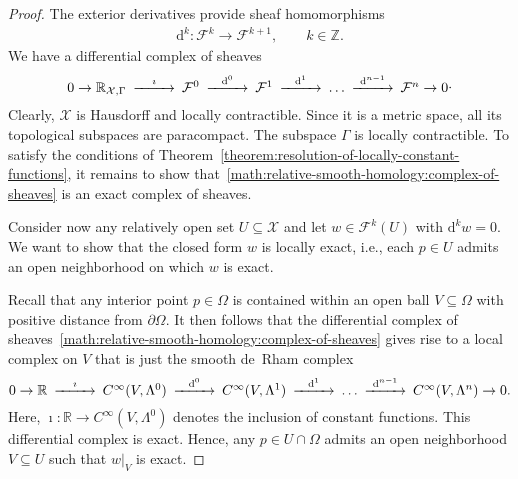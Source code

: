\documentclass[10pt,a4paper]{amsart}
\theoremstyle{definition}
\theoremstyle{remark}
\numberwithin{equation}{section}
\newcommand{\bbR}{{\mathbb R}}
\newcommand{\bbZ}{{\mathbb Z}}
\newcommand{\calF}{{\mathcal F}}
\newcommand{\calX}{{\mathcal X}}
\renewcommand{\restriction}{|}
\newcommand{\cartan}{{\mathrm d}}
\newcommand{\Domain}{{\Omega}}
\newcommand{\Alt}[1]{\Lambda^{#1}}
\begin{document}
\begin{proof}
    The exterior derivatives provide sheaf homomorphisms
    \begin{align*}
        \cartan^{k} : \calF^{k} \to \calF^{k+1}, \qquad k \in \bbZ 
        .
    \end{align*}
    We have a differential complex of sheaves 
    \begin{align}\label{math:relative-smooth-homology:complex-of-sheaves}
        \begin{CD}
            0 \to 
            \bbR_{\calX,\Gamma} 
            @>\imath>>
            \calF^{0} 
            @>\cartan^{0}>>
            \calF^{1} 
            @>\cartan^{1}>>
            \dots
            @>\cartan^{n-1}>>
            \calF^{n}
            \to 0
        \end{CD}
        .
    \end{align}
    Clearly, $\calX$ is Hausdorff and locally contractible.
    Since it is a metric space, all its topological subspaces are paracompact. 
    The subspace $\Gamma$ is locally contractible. 
    To satisfy the conditions of Theorem~\ref{theorem:resolution-of-locally-constant-functions},
    it remains to show that~\eqref{math:relative-smooth-homology:complex-of-sheaves} is an exact complex of sheaves.
    


    Consider now any relatively open set $U \subseteq \calX$ and let $w \in \calF^{k}(U)$ with $\cartan^{k} w = 0$. 
    We want to show that the closed form $w$ is locally exact, i.e., each $p \in U$ admits an open neighborhood on which $w$ is exact. 
    
    Recall that any interior point $p \in \Domain$ is contained within an open ball $V \subseteq \Domain$ with positive distance from $\partial\Domain$. 
    It then follows that the differential complex of sheaves~\eqref{math:relative-smooth-homology:complex-of-sheaves} gives rise to a local complex on $V$ that is just the smooth de~Rham complex 
    \begin{align*}
        \begin{CD}
            0 \to \bbR 
            @>\imath>>
            C^{\infty}(V,\Alt{0}) 
            @>\cartan^{  0}>> 
            C^{\infty}(V,\Alt{1}) 
            @>\cartan^{  1}>> 
            \dots
            @>\cartan^{n-1}>> 
            C^{\infty}(V,\Alt{n})
            \to 0
            .
        \end{CD}
    \end{align*}
    Here, $\imath : \bbR \to C^{\infty}(V,\Alt{0})$ denotes the inclusion of constant functions.
    This differential complex is exact. 
    Hence, any $p \in U \cap \Domain$ admits an open neighborhood $V \subseteq U$ such that $w \restriction_{V}$ is exact.
    



\end{proof}
\end{document}
